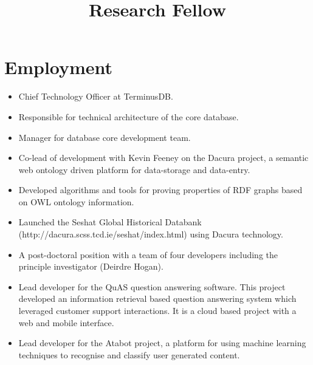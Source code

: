 \documentclass[a4paper,11pt]{moderncv}
\title{Research Fellow}
\begin{document}
\maketitle

\section{Employment}

{
  \begin{itemize}
  \item Chief Technology Officer at TerminusDB.
  \item Responsible for technical architecture of the core database.
  \item Manager for database core development team.
  \end{itemize}
}

{
  \begin{itemize}
  \item Co-lead of development with Kevin Feeney on the Dacura project, a semantic web ontology driven platform for data-storage and data-entry.
  \item Developed algorithms and tools for proving properties of RDF graphs based on OWL ontology information.
  \item Launched the Seshat Global Historical Databank (http://dacura.scss.tcd.ie/seshat/index.html) using Dacura technology.
  \end{itemize}
}

{
  \begin{itemize}
  \item A post-doctoral position with a team of four developers including the principle investigator (Deirdre Hogan).
  \item Lead developer for the QuAS question answering software. This project developed an information retrieval based question answering system which leveraged customer support interactions. It is a cloud based project with a web and mobile interface.
  \item Lead developer for the Atabot project, a platform for using machine learning techniques to recognise and classify user generated content.
  \end{itemize}
}
\end{document}
